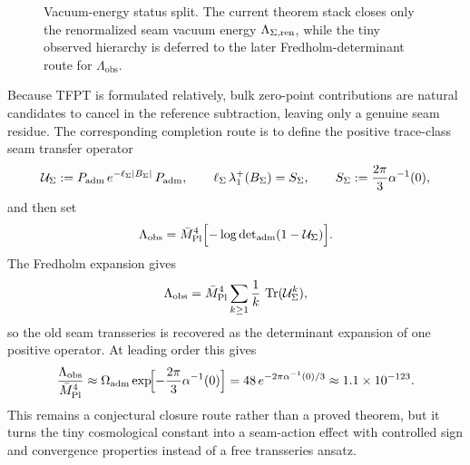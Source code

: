 \begin{figure}[t]
\centering
\scriptsize
{}
\caption{Vacuum-energy status split. The current theorem stack closes only the renormalized seam vacuum energy $\Lambda_{\Sigma,\mathrm{ren}}$, while the tiny observed hierarchy is deferred to the later Fredholm-determinant route for $\Lambda_{\mathrm{obs}}$.}
\label{fig:vacuum-energy-status}
\end{figure}

\begin{conjecture}
Because TFPT is formulated relatively, bulk zero-point contributions are natural
candidates to cancel in the reference subtraction, leaving only a genuine seam
residue. The corresponding completion route is to define the positive trace-class
seam transfer operator
\[
\mathcal U_\Sigma
:=
P_{\mathrm{adm}}\,e^{-\ell_\Sigma |B_\Sigma|}\,P_{\mathrm{adm}},
\qquad
\ell_\Sigma\,\lambda_1^+(B_\Sigma)=S_\Sigma,
\qquad
S_\Sigma:=\frac{2\pi}{3}\alpha^{-1}(0),
\]
and then set
\[
\Lambda_{\mathrm{obs}}
=
\bar M_{\mathrm{Pl}}^4\Bigl[-\log\det\nolimits_{\mathrm{adm}}(1-\mathcal U_\Sigma)\Bigr].
\]
The Fredholm expansion gives
\[
\Lambda_{\mathrm{obs}}
=
\bar M_{\mathrm{Pl}}^4\sum_{k\ge1}\frac{1}{k}\,\operatorname{Tr}(\mathcal U_\Sigma^k),
\]
so the old seam transseries is recovered as the determinant expansion of one
positive operator. At leading order this gives
\[
\frac{\Lambda_{\mathrm{obs}}}{\bar M_{\mathrm{Pl}}^4}
\approx
\Omega_{\mathrm{adm}}\exp\!\Bigl[-\frac{2\pi}{3}\alpha^{-1}(0)\Bigr]
=
48\,e^{-2\pi\alpha^{-1}(0)/3}
\approx
1.1\times10^{-123}.
\]
This remains a conjectural closure route rather than a proved theorem, but it
turns the tiny cosmological constant into a seam-action effect with controlled
sign and convergence properties instead of a free transseries ansatz.
\end{conjecture}

